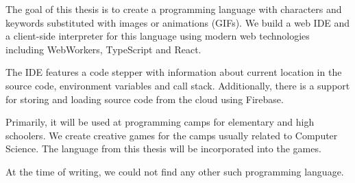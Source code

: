 \documentclass[12pt]{report}
\begin{document}
The goal of this thesis is to create a programming language with characters and keywords substituted
with images or animations (GIFs). We build a web IDE and a client-side interpreter for this language
using modern web technologies including WebWorkers, TypeScript and React.

The IDE features a code stepper with information about current location in the source
code, environment variables and call stack. Additionally, there is a support for storing and loading
source code from the cloud using Firebase. 

Primarily, it will be used at programming camps for elementary and high schoolers. We create creative
games for the camps usually related to Computer Science. The language from this thesis will be incorporated
into the games.

At the time of writing, we could not find any other such programming language.
\end{document}
